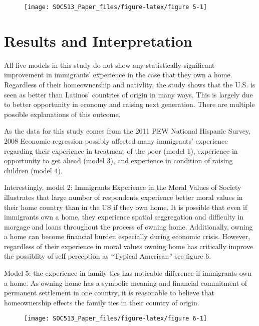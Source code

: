 \documentclass[11pt,]{article}
\begin{document}
\begin{figure}

{\centering \texttt{[image: SOC513\_Paper\_files/figure-latex/figure 5-1]} 

}

\end{figure}

\hypertarget{results-and-interpretation}{%
\section{Results and Interpretation}\label{results-and-interpretation}}

All five models in this study do not show any statistically significant
improvement in immigrants' experience in the case that they own a home.
Regardless of their homeownership and nativlity, the study shows that
the U.S. is seen as better than Latinos' countries of origin in many
ways. This is largely due to better opportunity in economy and raising
next generation. There are multiple possible explanations of this
outcome.

As the data for this study comes from the 2011 PEW National Hispanic
Survey, 2008 Economic regression possibly affected many immigrants'
experience regarding their experience in treatment of the poor (model
1), experience in opportunity to get ahead (model 3), and experience in
condition of raising children (model 4).

Interestingly, model 2: Immigrants Experience in the Moral Values of
Society illustrates that large number of respondents experience better
moral values in their home country than in the US if they own home. It
is possible that even if immigrants own a home, they experience spatial
seggregation and difficulty in morgage and loans throughout the process
of owning home. Additionally, owning a home can become financial burden
especially during economic crisis. However, regardless of their
experience in moral values owning home has critically improve the
possiblity of self perception as ``Typical American'' see figure 6.

Model 5: the experience in family ties has noticable difference if
immigrants own a home. As owning home has a symbolic meaning and
financial commitment of permanent settlement in one country, it is
reasonable to believe that homeownership effects the family ties in
their country of origin.

\begin{figure}

{\centering \texttt{[image: SOC513\_Paper\_files/figure-latex/figure 6-1]} 

}

\end{figure}
\end{document}
